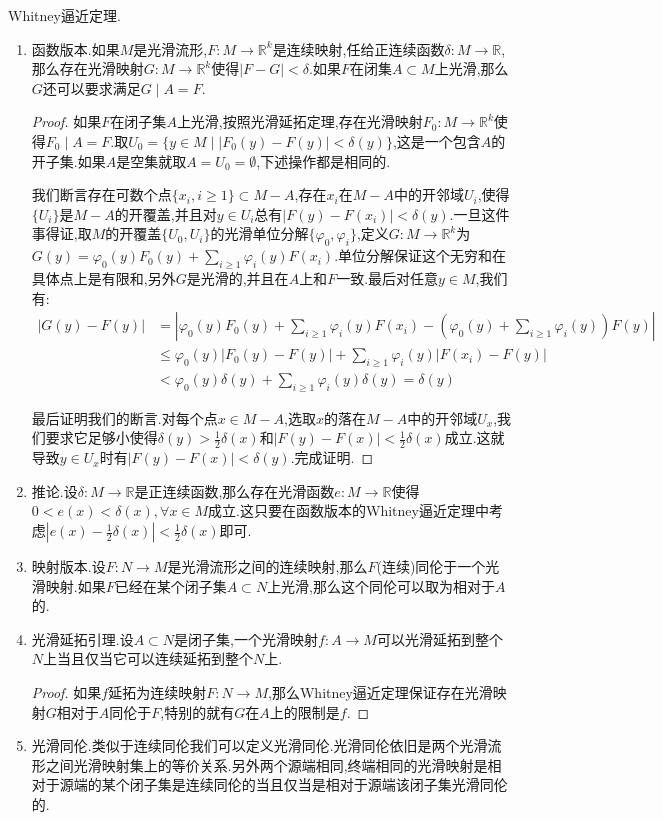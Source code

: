Whitney逼近定理.
\begin{enumerate}
	\item 函数版本.如果$M$是光滑流形,$F:M\to\mathbb{R}^k$是连续映射,任给正连续函数$\delta:M\to\mathbb{R}$,那么存在光滑映射$G:M\to\mathbb{R}^k$使得$|F-G|<\delta$.如果$F$在闭集$A\subset M$上光滑,那么$G$还可以要求满足$G\mid A=F$.
	\begin{proof}
		
		如果$F$在闭子集$A$上光滑,按照光滑延拓定理,存在光滑映射$F_0:M\to\mathbb{R}^k$使得$F_0\mid A=F$.取$U_0=\{y\in M\mid|F_0(y)-F(y)|<\delta(y)\}$,这是一个包含$A$的开子集.如果$A$是空集就取$A=U_0=\emptyset$,下述操作都是相同的.
		
		\qquad
		
		我们断言存在可数个点$\{x_i,i\ge1\}\subset M-A$,存在$x_i$在$M-A$中的开邻域$U_i$,使得$\{U_i\}$是$M-A$的开覆盖,并且对$y\in U_i$总有$|F(y)-F(x_i)|<\delta(y)$.一旦这件事得证,取$M$的开覆盖$\{U_0,U_i\}$的光滑单位分解$\{\varphi_0,\varphi_i\}$,定义$G:M\to\mathbb{R}^k$为$G(y)=\varphi_0(y)F_0(y)+\sum_{i\ge1}\varphi_i(y)F(x_i)$.单位分解保证这个无穷和在具体点上是有限和,另外$G$是光滑的,并且在$A$上和$F$一致.最后对任意$y\in M$,我们有:
		\begin{align*}
		|G(y)-F(y)|&=\left|\varphi_0(y)F_0(y)+\sum_{i\ge1}\varphi_i(y)F(x_i)-\left(\varphi_0(y)+\sum_{i\ge1}\varphi_i(y)\right)F(y)\right|\\&\le\varphi_0(y)|F_0(y)-F(y)|+\sum_{i\ge1}\varphi_i(y)|F(x_i)-F(y)|\\&<\varphi_0(y)\delta(y)+\sum_{i\ge1}\varphi_i(y)\delta(y)=\delta(y)
		\end{align*}
		
		最后证明我们的断言.对每个点$x\in M-A$,选取$x$的落在$M-A$中的开邻域$U_x$,我们要求它足够小使得$\delta(y)>\frac{1}{2}\delta(x)$和$|F(y)-F(x)|<\frac{1}{2}\delta(x)$成立.这就导致$y\in U_x$时有$|F(y)-F(x)|<\delta(y)$.完成证明.
	\end{proof}
    \item 推论.设$\delta:M\to\mathbb{R}$是正连续函数,那么存在光滑函数$e:M\to\mathbb{R}$使得$0<e(x)<\delta(x),\forall x\in M$成立.这只要在函数版本的Whitney逼近定理中考虑$|e(x)-\frac{1}{2}\delta(x)|<\frac{1}{2}\delta(x)$即可.
    \item 映射版本.设$F:N\to M$是光滑流形之间的连续映射,那么$F$(连续)同伦于一个光滑映射.如果$F$已经在某个闭子集$A\subset N$上光滑,那么这个同伦可以取为相对于$A$的.
    \item 光滑延拓引理.设$A\subset N$是闭子集,一个光滑映射$f:A\to M$可以光滑延拓到整个$N$上当且仅当它可以连续延拓到整个$N$上.
    \begin{proof}
    	
    	如果$f$延拓为连续映射$F:N\to M$,那么Whitney逼近定理保证存在光滑映射$G$相对于$A$同伦于$F$,特别的就有$G$在$A$上的限制是$f$.
    \end{proof}
    \item 光滑同伦.类似于连续同伦我们可以定义光滑同伦.光滑同伦依旧是两个光滑流形之间光滑映射集上的等价关系.另外两个源端相同,终端相同的光滑映射是相对于源端的某个闭子集是连续同伦的当且仅当是相对于源端该闭子集光滑同伦的.
\end{enumerate}

